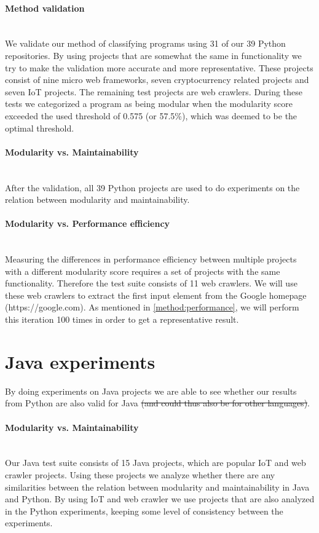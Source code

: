 \documentclass[twoside]{uva-inf-bachelor-thesis}
\newcommand{\myparagraph}[1]{\paragraph{#1}\mbox{}\\}
\begin{document}
\myparagraph{Method validation}
We validate our method of classifying programs using 31 of our 39 Python repositories. By using projects that are somewhat the same in functionality we try to make the validation more accurate and more representative. These projects consist of nine micro web frameworks, seven cryptocurrency related projects and seven IoT projects. The remaining test projects are web crawlers. During these tests we categorized a program as being modular when the modularity score exceeded the used threshold of 0.575 (or 57.5\%), which was deemed to be the optimal threshold.

\myparagraph{Modularity vs. Maintainability}
After the validation, all 39 Python projects are used to do experiments on the relation between modularity and maintainability.

\myparagraph{Modularity vs. Performance efficiency}
Measuring the differences in performance efficiency between multiple projects with a different modularity score requires a set of projects with the same functionality. Therefore the test suite consists of 11 web crawlers. We will use these web crawlers to extract the first input element from the Google homepage (https://google.com). As mentioned in \autoref{method:performance}, we will perform this iteration 100 times in order to get a representative result.

\section{Java experiments}
By doing experiments on Java projects we are able to see whether our results from Python are also valid for Java \sout{(and could thus also be for other languages)}.

\myparagraph{Modularity vs. Maintainability}
Our Java test suite consists of 15 Java projects, which are popular IoT and web crawler projects. Using these projects we analyze whether there are any similarities between the relation between modularity and maintainability in Java and Python. By using IoT and web crawler we use projects that are also analyzed in the Python experiments, keeping some level of consistency between the experiments.
\end{document}
